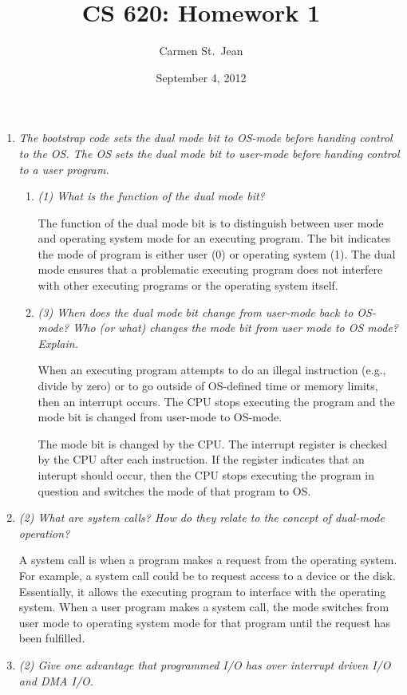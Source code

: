 \documentclass[letterpaper,11pt]{article}
\begin{document}
\title{CS 620: Homework 1}
\date{September 4, 2012}
\author{Carmen St.\ Jean}

\maketitle



\begin{enumerate}
  \item \emph{The bootstrap code sets the dual mode bit to OS-mode before handing control to the OS. The OS sets the dual mode bit to user-mode before handing control to a user program.}
  \begin{enumerate}
    \item \emph{(1) What is the function of the dual mode bit?}

    The function of the dual mode bit is to distinguish between user mode and operating system mode for an executing program.  The bit indicates the mode of program is either user (0) or operating system (1).  The dual mode ensures that a problematic executing program does not interfere with other executing programs or the operating system itself.
    \item \emph{(3) When does the dual mode bit change from user-mode back to OS-mode? Who (or what) changes the mode bit from user mode to OS mode? Explain.}

    When an executing program attempts to do an illegal instruction (e.g., divide by zero) or to go outside of OS-defined time or memory limits, then an interrupt occurs.  The CPU stops executing the program and the mode bit is changed from user-mode to OS-mode.

    The mode bit is changed by the CPU.  The interrupt register is checked by the CPU after each instruction.  If the register indicates that an interupt should occur, then the CPU stops executing the program in question and switches the mode of that program to OS. 
  \end{enumerate}
  \item \emph{(2) What are system calls? How do they relate to the concept of dual-mode operation?}

  A system call is when a program makes a request from the operating system.  For example, a system call could be to request access to a device or the disk. Essentially, it allows the executing program to interface with the operating system.  When a user program makes a system call, the mode switches from user mode to operating system mode for that program until the request has been fulfilled.
  \item \emph{(2) Give one advantage that programmed I/O has over interrupt driven I/O and DMA I/O.}


\end{enumerate}
\end{document}
